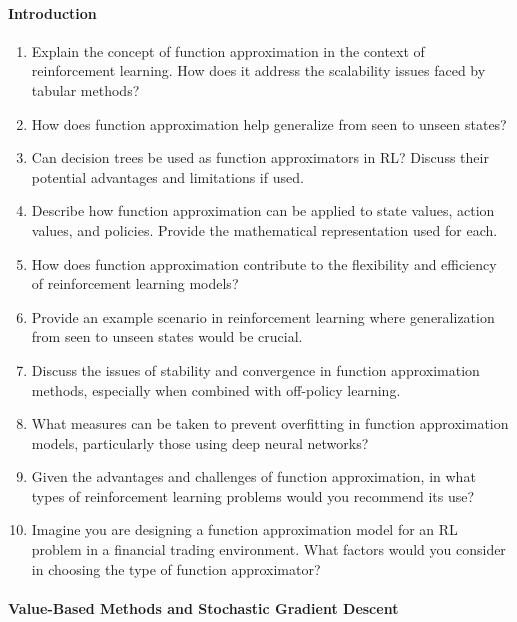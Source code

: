\paragraph*{Introduction}
\begin{enumerate}[nosep]
	\item Explain the concept of function approximation in the context of reinforcement learning. How does it address the scalability issues faced by tabular methods?
    \item How does function approximation help generalize from seen to unseen states?
    \item Can decision trees be used as function approximators in RL? Discuss their potential advantages and limitations if used.
    \item Describe how function approximation can be applied to state values, action values, and policies. Provide the mathematical representation used for each.
    \item How does function approximation contribute to the flexibility and efficiency of reinforcement learning models?
    \item Provide an example scenario in reinforcement learning where generalization from seen to unseen states would be crucial.
    \item Discuss the issues of stability and convergence in function approximation methods, especially when combined with off-policy learning.
    \item What measures can be taken to prevent overfitting in function approximation models, particularly those using deep neural networks?
    \item Given the advantages and challenges of function approximation, in what types of reinforcement learning problems would you recommend its use?
    \item Imagine you are designing a function approximation model for an RL problem in a financial trading environment. What factors would you consider in choosing the type of function approximator? 
 \end{enumerate}

\paragraph*{Value-Based Methods and Stochastic Gradient Descent}


